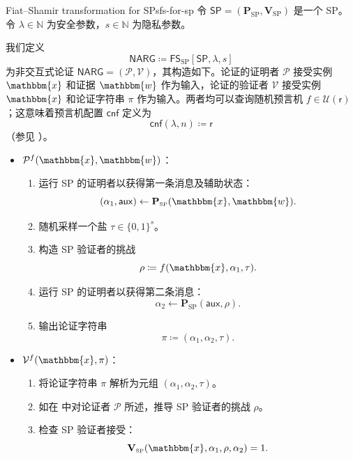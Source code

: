 \documentclass[american,singlepageview]{snargs-book-zh}
\newcommand{\Bits}{\{0,1\}}
\newcommand{\DefineEqual}{\coloneqq}
\newcommand{\AuxiliaryState}{\mathsf{aux}}
\newcommand{\Naturals}{\mathbb{N}}
\newcommand{\Instance}{\mathbbm{x}}
\newcommand{\Witness}{\mathbbm{w}}
\newcommand{\InstanceSize}{n}
\newcommand{\ProtoProver}{P}
\newcommand{\ProtoVerifier}{V}
\newcommand{\ProtoSalt}{\tau}
\newcommand{\ProtoRandomnessComplexity}{\mathsf{r}}
\newcommand{\SPSymbol}{\mathsf{SP}}
\newcommand{\SPSubscript}{\scriptscriptstyle\mathrm{SP}}
\newcommand{\SPFormat}[1]{\mathbf{#1}}
\newcommand{\SPProver}{\SPFormat{\ProtoProver}_{\SPSubscript}}
\newcommand{\SPVerifier}{\SPFormat{\ProtoVerifier}_{\SPSubscript}}
\newcommand{\SPSystem}{(\SPProver,\SPVerifier)}
\newcommand{\SPCommitment}{\alpha_{1}}
\newcommand{\SPChallenge}{\rho}
\newcommand{\SPResponse}{\alpha_{2}}
\newcommand{\SPRandomnessComplexity}{\ProtoRandomnessComplexity}
\newcommand{\NARGSymbol}{\mathsf{NARG}}
\newcommand{\ARGFormat}[1]{\mathcal{#1}}
\newcommand{\ARGOracles}{\mathsf{cnf}}
\newcommand{\ARGProver}{\ARGFormat{\ProtoProver}}
\newcommand{\ARGVerifier}{\ARGFormat{\ProtoVerifier}}
\newcommand{\ARGSystem}{(\ARGProver,\ARGVerifier)}
\newcommand{\ARGString}{\pi}
\newcommand{\ROFunction}{f}
\newcommand{\RODistribution}[1]{\mathcal{U}(#1)}
\newcommand{\SecurityParameter}{\lambda}
\newcommand{\PrivacyParameter}{s}
\newcommand{\RandSaltString}{\ProtoSalt}
\newcommand{\RandSaltSize}{s}
\newcommand{\FormatTransName}[1]{\bm{\mathsf{#1}}}
\newcommand{\FSonSPSymbol}{\FormatTransName{FS}_{\SPSubscript}}
\newcommand{\FormatTransInputs}[3]{[#1,#2,#3]}
\newcommand{\FSonSPTransformation}[3]{\FSonSPSymbol\FormatTransInputs{#1}{#2}{#3}}
\newcommand{\FSonSPText}{Fiat--Shamir transformation for SPs\xspace}
\newcommand{\SPFSARGString}{(\SPCommitment,\SPResponse,\RandSaltString)}
\begin{document}
\begin{ImportantConstruction}{\FSonSPText}{fs-for-sp}
令 $\SPSymbol=\SPSystem$ 是一个 SP。令 $\SecurityParameter \in \Naturals$ 为安全参数，$\PrivacyParameter \in \Naturals$ 为隐私参数。

我们定义
\[
  \NARGSymbol \DefineEqual \FSonSPTransformation{\SPSymbol}{\SecurityParameter}{\PrivacyParameter}
\]
为非交互式论证 $\NARGSymbol=\ARGSystem$，其构造如下。论证的证明者 $\ARGProver$ 接受实例 $\Instance$ 和证据 $\Witness$ 作为输入，论证的验证者 $\ARGVerifier$ 接受实例 $\Instance$ 和论证字符串 $\ARGString$ 作为输入。两者均可以查询随机预言机 $\ROFunction \in \RODistribution{\SPRandomnessComplexity}$；这意味着预言机配置 $\ARGOracles$ 定义为
\[
  \ARGOracles(\SecurityParameter,\InstanceSize) \DefineEqual \SPRandomnessComplexity
\]
（参见 ）。
\begin{itemize}
  \item $\ARGProver^{\ROFunction}(\Instance,\Witness)$：
  \begin{enumerate}[nolistsep]
    \item 运行 SP 的证明者以获得第一条消息及辅助状态：
      \[
        (\SPCommitment,\AuxiliaryState) \gets \SPProver(\Instance,\Witness).
      \]
    \item 随机采样一个盐 $\RandSaltString \in \Bits^{\RandSaltSize}$。
    \item\label{step:fs-for-sigma-protocol-challenge-derivation}
      构造 SP 验证者的挑战
      \[
        \SPChallenge \DefineEqual \ROFunction(\Instance,\SPCommitment,\RandSaltString).
      \]
    \item 运行 SP 的证明者以获得第二条消息：
      \[
        \SPResponse \gets \SPProver(\AuxiliaryState,\SPChallenge).
      \]
    \item 输出论证字符串
      \[
        \ARGString \DefineEqual \SPFSARGString.
      \]
  \end{enumerate}
  \item $\ARGVerifier^{\ROFunction}(\Instance,\ARGString)$：
  \begin{enumerate}[nolistsep]
    \item 将论证字符串 $\ARGString$ 解析为元组 $\SPFSARGString$。
    \item 如在  中对论证者 $\ARGProver$ 所述，推导 SP 验证者的挑战 $\SPChallenge$。
    \item 检查 SP 验证者接受：
      \[
        \SPVerifier(\Instance,\SPCommitment,\SPChallenge,\SPResponse)=1.
      \]
  \end{enumerate}
\end{itemize}
\end{ImportantConstruction}
\end{document}

